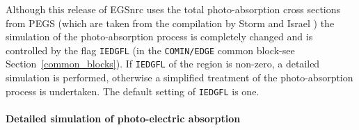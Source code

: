 Although this release of EGSnrc uses the total photo-absorption
cross sections from PEGS (which are taken from the
compilation by Storm and Israel \cite{SI70})
the simulation of the photo-absorption process
is completely changed and is controlled
by the flag {\tt IEDGFL}
(in the {\tt COMIN/EDGE} common block-see Section~\ref{common_blocks}). If {\tt IEDGFL} of the
region is non-zero, a detailed simulation is performed,
otherwise a simplified treatment of the photo-absorption process
is undertaken. The default setting of {\tt IEDGFL} is one.

\paragraph{Detailed simulation of photo-electric absorption}\hfill
\label{photo_detailed}

